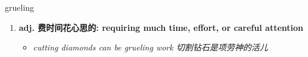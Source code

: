 
\begin{frame}
{\huge grueling}
\begin{center}
\begin{enumerate}\Large
  \item \textbf{adj. 费时间花心思的: requiring much time, effort, or careful attention}
  \begin{itemize}
    \item \em{\Large{cutting diamonds can be grueling work 切割钻石是项劳神的活儿}}
  \end{itemize}
\end{enumerate}
\end{center}
\end{frame}
